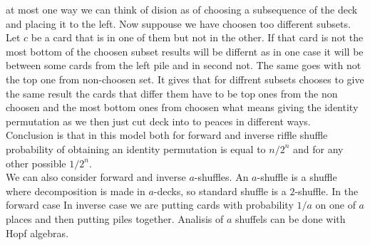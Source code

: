 \documentclass[a4paper, 12pt]{article}
\begin{document}
at most one way we can think of dision as of choosing a subsequence of the deck and placing it to the left.
Now suppouse we have choosen too different subsets. Let $c$ be a card that is in one of them but not in the
other. If that card is not the most bottom of the choosen subset results will be differnt as in one case
it will be between some cards from the left pile and in second not. The same goes with not the top one
from non-choosen set. It gives that for diffrent subsets chooses to give the same result the cards that
differ them have to be top ones from the non choosen and the most bottom ones from choosen what means
giving the identity permutation as we then just cut deck into to peaces in different ways. \\
Conclusion is that in this model both for forward and inverse riffle shuffle probability of obtaining
an identity permutation is equal to $n/2^n$ and for any other possible $1/2^n$. \\
We can also consider forward and inverse $a$-shuffles. An $a$-shuffle is a shuffle where decomposition
is made in $a$-decks, so standard shuffle is a $2$-shuffle. In the forward case  In inverse case we are putting cards with
probability $1/a$ on one of $a$ places and then putting piles together. Analisis of $a$ shuffels can be done
with Hopf algebras.
\end{document}
